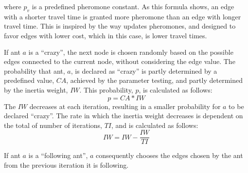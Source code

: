 where $p_v$ is a predefined pheromone constant. As this formula shows, an edge with a shorter travel time is granted more pheromone than an edge with longer travel time. This is inspired by the way \citet{hsiao04} updates pheromones, and designed to favor edges with lower cost, which in this case, is lower travel times. 

If ant $a$ is a ``crazy'', the next node is chosen randomly based on the possible edges connected to the current node, without considering the edge value. The probability that ant, $a$, is declared as ``crazy'' is partly determined by a predefined value, $CA$, achieved by the parameter testing, and partly determined by the inertia weight, $IW$. This probability, $p$, is calculated as follows:
$$p = CA*IW$$
The $IW$ decreases at each iteration, resulting in a smaller probability for $a$ to be declared ``crazy''. The rate in which the inertia weight decreases is dependent on the total of number of iterations, $TI$, and is calculated as follows:
$$IW = IW - \frac{IW}{TI}$$

If ant $a$ is a ``following ant'', $a$ consequently chooses the edges chosen by the ant from the previous iteration it is following.  %